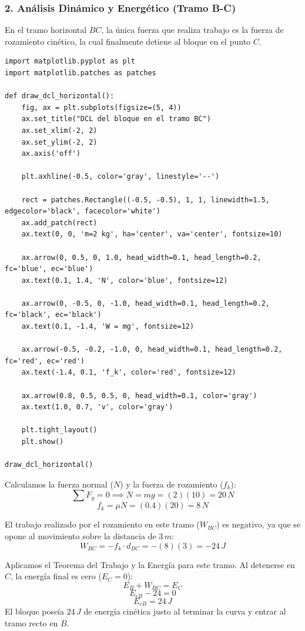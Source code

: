 \documentclass[12pt, a4paper]{article}
\begin{document}
\subsubsection*{2. Análisis Dinámico y Energético (Tramo B-C)}
En el tramo horizontal $BC$, la única fuerza que realiza trabajo es la fuerza de rozamiento cinético, la cual finalmente detiene al bloque en el punto $C$.

\begin{lstlisting}
import matplotlib.pyplot as plt
import matplotlib.patches as patches

def draw_dcl_horizontal():
    fig, ax = plt.subplots(figsize=(5, 4))
    ax.set_title("DCL del bloque en el tramo BC")
    ax.set_xlim(-2, 2)
    ax.set_ylim(-2, 2)
    ax.axis('off')
    
    plt.axhline(-0.5, color='gray', linestyle='--')
    
    rect = patches.Rectangle((-0.5, -0.5), 1, 1, linewidth=1.5, edgecolor='black', facecolor='white')
    ax.add_patch(rect)
    ax.text(0, 0, 'm=2 kg', ha='center', va='center', fontsize=10)
    
    ax.arrow(0, 0.5, 0, 1.0, head_width=0.1, head_length=0.2, fc='blue', ec='blue')
    ax.text(0.1, 1.4, 'N', color='blue', fontsize=12)
    
    ax.arrow(0, -0.5, 0, -1.0, head_width=0.1, head_length=0.2, fc='black', ec='black')
    ax.text(0.1, -1.4, 'W = mg', fontsize=12)
    
    ax.arrow(-0.5, -0.2, -1.0, 0, head_width=0.1, head_length=0.2, fc='red', ec='red')
    ax.text(-1.4, 0.1, 'f_k', color='red', fontsize=12)
    
    ax.arrow(0.8, 0.5, 0.5, 0, head_width=0.1, color='gray')
    ax.text(1.0, 0.7, 'v', color='gray')

    plt.tight_layout()
    plt.show()

draw_dcl_horizontal()
\end{lstlisting}

Calculamos la fuerza normal ($N$) y la fuerza de rozamiento ($f_k$):
$$ \sum F_y = 0 \implies N = mg = (2)(10) = 20 \, \si{N} $$
$$ f_k = \mu N = (0.4)(20) = 8 \, \si{N} $$

El trabajo realizado por el rozamiento en este tramo ($W_{BC}$) es negativo, ya que se opone al movimiento sobre la distancia de $3 \, \si{m}$:
$$ W_{BC} = -f_k \cdot d_{BC} = -(8)(3) = -24 \, \si{J} $$

Aplicamos el Teorema del Trabajo y la Energía para este tramo. Al detenerse en $C$, la energía final es cero ($E_C = 0$):
$$ E_B + W_{BC} = E_C $$
$$ E_{cB} - 24 = 0 $$
$$ E_{cB} = 24 \, \si{J} $$
El bloque poseía $24 \, \si{J}$ de energía cinética justo al terminar la curva y entrar al tramo recto en $B$.
\end{document}
